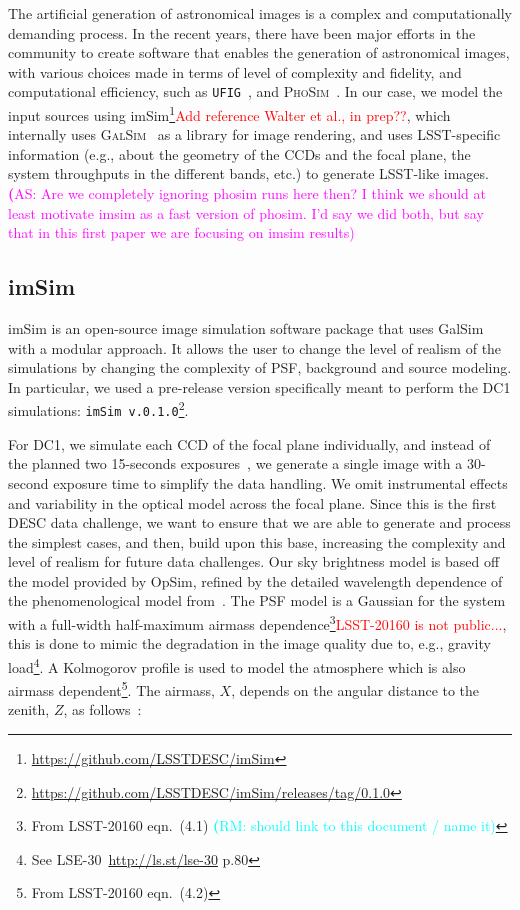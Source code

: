 \documentclass[twocolumn]{aastex62}
\newcommand{\rachel}[1]{{\textcolor{cyan}{{\textbf (RM: #1)}}}}
\newcommand{\as}[1]{{\textcolor{magenta}{{\textbf (AS: #1)}}}}
\begin{document}
The artificial generation of astronomical images is a complex and computationally demanding process. In the recent
years, there have been major efforts in the community to create software that enables the generation of astronomical images, with various choices made in terms of level of complexity and fidelity, and computational efficiency, such as \texttt{UFIG}~\citep{2016ApJ...817...25B}, and \textsc{PhoSim}~\citep{2015ApJS..218...14P}. In our case, we model the input sources using imSim\footnote{\url{https://github.com/LSSTDESC/imSim}}\textcolor{red}{Add reference Walter et al., in prep??}, which internally uses \textsc{GalSim}~\citep{2015A&C....10..121R} as a library for image rendering, and uses LSST-specific information (e.g., about the geometry of the CCDs and the focal plane, the system throughputs in the different bands, etc.) to generate LSST-like images.
\as{Are we completely ignoring phosim runs here then? I think we should at least motivate imsim as a fast version of phosim. I'd say we did both, but say that in this first paper we are focusing on imsim results}


\subsection{imSim}
\label{sec:imsim_pipeline}

imSim is an open-source image simulation software package that uses GalSim with a modular approach. It allows the user to change the level of realism of the simulations by changing the complexity of PSF, background and source modeling. In particular, we used a pre-release version specifically meant to perform the DC1 simulations: \texttt{imSim v.0.1.0}\footnote{\url{https://github.com/LSSTDESC/imSim/releases/tag/0.1.0}}.


For DC1, we simulate each CCD of the focal plane individually, and instead of the planned two 15-seconds exposures~\citep{Overview}, we generate a single image with a 30-second exposure time to simplify the data handling. We omit instrumental effects and variability in the optical model across the focal plane. Since this is the first DESC data challenge, we want to ensure that we are able to generate and process the simplest cases, and then, build upon this base, increasing the complexity and level of realism for future data challenges. Our sky brightness model is based off the \citet{1991PASP..103.1033K} model provided by OpSim, refined by the detailed wavelength dependence of the phenomenological model from~\citet{2016SPIE.9910E..1AY}. The PSF model is a Gaussian for the system with a full-width half-maximum airmass dependence\footnote{From LSST-20160 eqn.~(4.1) \rachel{should link to this document / name it}}\textcolor{red}{LSST-20160 is not public...}, this is done to mimic the degradation in the image quality due to, e.g., gravity load\footnote{See LSE-30~\url{http://ls.st/lse-30} p.80}. A Kolmogorov profile is used to model the atmosphere which is also airmass dependent\footnote{From LSST-20160 eqn.~(4.2)}. The airmass, $X$, depends on the angular distance to the zenith, $Z$, as follows~\citep{1991PASP..103.1033K}:
\end{document}
